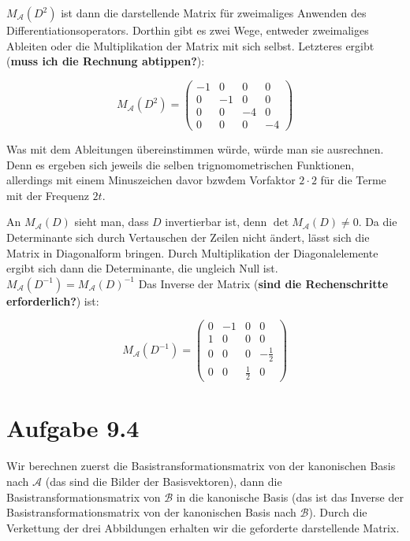 \documentclass[a4paper,german,12pt,smallheadings]{scrartcl}
\begin{document}
$M_{\mathcal{A}}(D^2)$ ist dann die darstellende Matrix für zweimaliges
Anwenden des Differentiationsoperators. Dorthin gibt es zwei Wege, entweder
zweimaliges Ableiten oder die Multiplikation der Matrix mit sich selbst.
Letzteres ergibt (\textbf{muss ich die Rechnung abtippen?}):

\begin{equation}
  M_{\mathcal{A}}(D^2) = \begin{pmatrix}-1 & 0 & 0 & 0 \\ 0 & -1 & 0 & 0 \\ 0 & 0 & -4 & 0 \\ 0 & 0 & 0 & -4\end{pmatrix}
\end{equation}

Was mit dem Ableitungen übereinstimmen würde, würde man sie ausrechnen. Denn es
ergeben sich jeweils die selben trignomometrischen Funktionen, allerdings mit
einem Minuszeichen davor bzw\. dem Vorfaktor $2 \cdot 2$ für die Terme mit der
Frequenz $2t$.

An $M_{\mathcal{A}}(D)$ sieht man, dass $D$ invertierbar ist, denn $\det
M_{\mathcal{A}}(D) \neq 0$. Da die Determinante sich durch Vertauschen der
Zeilen nicht ändert, lässt sich die Matrix in Diagonalform bringen. Durch
Multiplikation der Diagonalelemente ergibt sich dann die Determinante, die
ungleich Null ist. $M_{\mathcal{A}}(D^{-1}) = M_{\mathcal{A}}(D)^{-1}$  Das
Inverse der Matrix (\textbf{sind die Rechenschritte erforderlich?}) ist:

\begin{equation}
  M_{\mathcal{A}}(D^{-1}) = \begin{pmatrix}0 & -1 & 0 & 0 \\ 1 & 0 & 0 & 0 \\ 0 & 0 & 0 & -\frac{1}{2} \\ 0 & 0 & \frac{1}{2} & 0\end{pmatrix}
\end{equation}


\section*{Aufgabe 9.4}
Wir berechnen zuerst die Basistransformationsmatrix von der kanonischen Basis
nach $\mathcal{A}$ (das sind die Bilder der Basisvektoren), dann die
Basistransformationsmatrix von $\mathcal{B}$ in die kanonische Basis (das ist
das Inverse der Basistransformationsmatrix von der kanonischen Basis nach
$\mathcal{B}$). Durch die Verkettung der drei Abbildungen erhalten wir die
geforderte darstellende Matrix.
\end{document}
